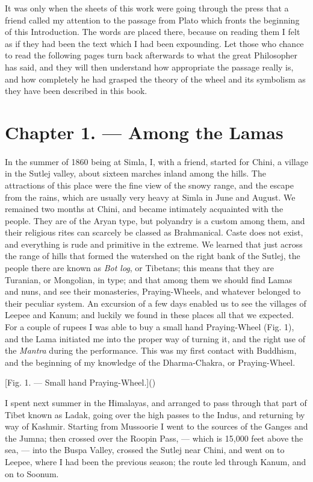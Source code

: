 \documentclass[a4paper, 11pt, oneside, polutonikogreek, english]{article}
\begin{document}
It was only when the sheets of this work were going through the press that a friend called my attention to the passage from Plato which fronts the beginning of this Introduction. The words are placed there, because on reading them I felt as if they had been the text which I had been expounding. Let those who chance to read the following pages turn back afterwards to what the great Philosopher has said, and they will then understand how appropriate the passage really is, and how completely he had grasped the theory of the wheel and its symbolism as they have been described in this book.
\clearpage
\section{Chapter 1. --- Among the Lamas}
\paragraph{}
In the summer of 1860 being at Simla, I, with a friend, started for Chini, a village in the Sutlej valley, about sixteen marches inland among the hills. The attractions of this place were the fine view of the snowy range, and the escape from the rains, which are usually very heavy at Simla in June and August. We remained two months at Chini, and became intimately acquainted with the people. They are of the Aryan type, but polyandry is a custom among them, and their religious rites can scarcely be classed as Brahmanical. Caste does not exist, and everything is rude and primitive in the extreme. We learned that just across the range of hills that formed the watershed on the right bank of the Sutlej, the people there are known as \emph{Bot log}, or Tibetans; this means that they are Turanian, or Mongolian, in type; and that among them we should find Lamas and nuns, and see their monasteries, Praying-Wheels, and whatever belonged to their peculiar system. An excursion of a few days enabled us to see the villages of Leepee and Kanum; and luckily we found in these places all that we expected. For a couple of rupees I was able to buy a small hand Praying-Wheel (Fig. 1), and the Lama initiated me into the proper way of turning it, and the right use of the \emph{Mantra} during the performance. This was my first contact with Buddhism, and the beginning of my knowledge of the Dharma-Chakra, or Praying-Wheel.

[Fig. 1. --- Small hand Praying-Wheel.]()

I spent next summer in the Himalayas, and arranged to pass through that part of Tibet known as Ladak, going over the high passes to the Indus, and returning by way of Kashmir. Starting from Mussoorie I went to the sources of the Ganges and the Jumna; then crossed over the Roopin Pass, --- which is 15,000 feet above the sea, --- into the Buspa Valley, crossed the Sutlej near Chini, and went on to Leepee, where I had been the previous season; the route led through Kanum, and on to Soonum.
\end{document}

